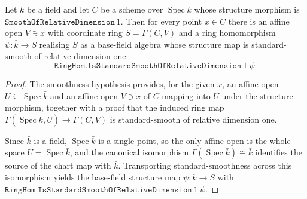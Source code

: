 
\begin{lemma}

  \label{lem:exists_standardSmooth_chart_of_smooth}
  Let \(\bar k\) be a field and let \(C\) be a scheme over
  \(\operatorname{Spec} \bar k\) whose structure morphism is
  \(\texttt{SmoothOfRelativeDimension}\ 1\). Then for every point
  \(x \in C\) there is an affine open \(V \ni x\) with coordinate
  ring \(S = \Gamma(C, V)\) and a ring homomorphism
  \(\psi : \bar k \to S\) realising \(S\) as a base-field algebra whose
  structure map is standard-smooth of relative dimension one:
  \[
    \texttt{RingHom.IsStandardSmoothOfRelativeDimension}\ 1\ \psi .
  \]
\end{lemma}

\begin{proof}

\leanok
  The smoothness hypothesis provides, for the given \(x\), an affine open
  \(U \subseteq \operatorname{Spec} \bar k\) and an affine open
  \(V \ni x\) of \(C\) mapping into \(U\) under the structure morphism, together
  with a proof that the induced ring map
  \(\Gamma(\operatorname{Spec} \bar k, U) \to \Gamma(C, V)\)
  is standard-smooth of relative dimension one.

  Since \(\bar k\) is a field, \(\operatorname{Spec} \bar k\) is a single point,
  so the only affine open is the whole space \(U = \operatorname{Spec} \bar k\),
  and the canonical isomorphism \(\Gamma(\operatorname{Spec} \bar k) \cong \bar k\)
  identifies the source of the chart map with \(\bar k\). Transporting
  standard-smoothness across this isomorphism yields the base-field structure map
  \(\psi : \bar k \to S\) with
  \(\texttt{RingHom.IsStandardSmoothOfRelativeDimension}\ 1\ \psi\).
\end{proof}

